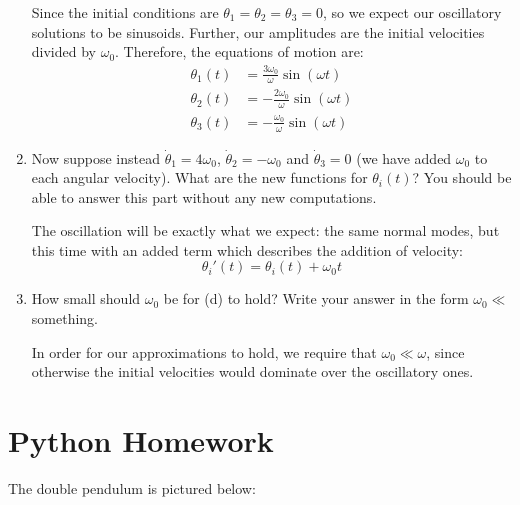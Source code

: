 \documentclass[10pt]{article}
\begin{document}
\begin{enumerate}[label=\alph*)]
			\begin{solution}
				Since the initial conditions are $\theta_1 = \theta_2 = \theta_3 = 0$, so we expect our 
				oscillatory solutions to be sinusoids. Further, our amplitudes are the initial velocities 
				divided by $\omega_0$. Therefore, the equations of motion are: 
				\begin{align*}
					\theta_1(t) &=  \frac{3\omega_0}{\omega}\sin(\omega t) \\
					\theta_2(t) &=  -\frac{2\omega_0}{\omega}\sin (\omega t) \\
					\theta_3(t) &= -\frac{\omega_0}{\omega}\sin (\omega t)
				\end{align*}
			\end{solution}

		\item Now suppose instead $\dot \theta_1 = 4\omega_0$, $\dot \theta_2 = -\omega_0$ and $\dot \theta_3 
			= 0$ (we have added $\omega_0$ to each angular velocity). What are the new functions for 
			$\theta_i(t)$? You should be able to answer this part without any new computations. 
			
			\begin{solution}
				The oscillation will be exactly what we expect: the same normal modes, but this time with 
				an added term which describes the addition of velocity: 
				\[
				\theta_i'(t) = \theta_i(t) + \omega_0t
				\] 
			\end{solution}
		\item How small should $\omega_0$ be for (d) to hold? Write your answer in the form $\omega_0 \ll$ 
			something. 
		
			\begin{solution}
				In order for our approximations to hold, we require that $\omega_0 \ll \omega$, since otherwise
				the initial velocities would dominate over the oscillatory ones. 
			\end{solution}
	\end{enumerate}

	\pagebreak
	\section*{Python Homework}
	The double pendulum is pictured below:
\end{document}
